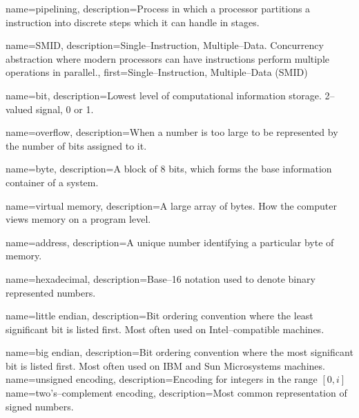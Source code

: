  {
    name=pipelining,
    description={Process in which a processor partitions a instruction into discrete steps which it can handle in stages.}
}

 {
    name=SMID,
    description={Single--Instruction, Multiple--Data. Concurrency abstraction where modern processors can have instructions perform multiple operations in parallel.},
    first={Single--Instruction, Multiple--Data (SMID)}
}

 {
    name=bit,
    description={Lowest level of computational information storage. 2--valued signal, 0 or 1.}
}

 {
    name=overflow,
    description={When a number is too large to be represented by the number of bits assigned to it.}
}

 {
    name=byte,
    description={A block of 8 bits, which forms the base information container of a system.}
}

 {
    name=virtual memory,
    description={A large array of bytes. How the computer views memory on a program level.}
}

 {
    name=address,
    description={A unique number identifying a particular byte of memory.}
}

 {
    name=hexadecimal,
    description={Base--16 notation used to denote binary represented numbers.}
}

 {
    name=little endian,
    description={Bit ordering convention where the least significant bit is listed first. Most often used on Intel--compatible machines.}
}

 {
    name=big endian,
    description={Bit ordering convention where the most significant bit is listed first. Most often used on IBM and Sun Microsystems machines.}
}
 {
    name=unsigned encoding,
    description={Encoding for integers in the range \(\left[ 0, i \right]\) }
}
 {
    name=two's--complement encoding,
    description={Most common representation of signed numbers.}
}